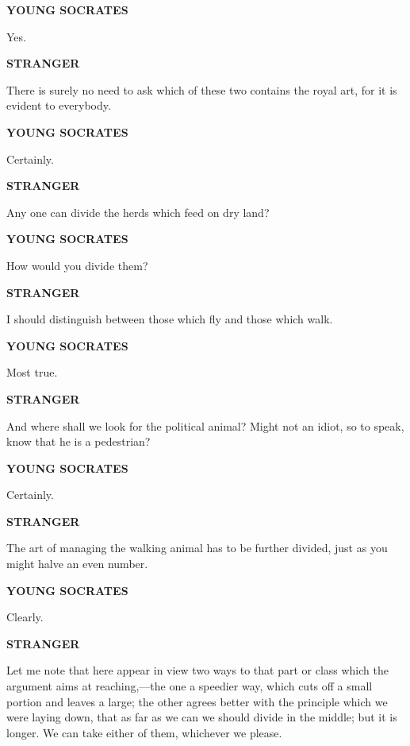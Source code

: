 \documentclass[11pt,letter]{article}
\begin{document}
\par \textbf{YOUNG SOCRATES}
\par   Yes.

\par \textbf{STRANGER}
\par   There is surely no need to ask which of these two contains the royal art, for it is evident to everybody.

\par \textbf{YOUNG SOCRATES}
\par   Certainly.

\par \textbf{STRANGER}
\par   Any one can divide the herds which feed on dry land?

\par \textbf{YOUNG SOCRATES}
\par   How would you divide them?

\par \textbf{STRANGER}
\par   I should distinguish between those which fly and those which walk.

\par \textbf{YOUNG SOCRATES}
\par   Most true.

\par \textbf{STRANGER}
\par   And where shall we look for the political animal? Might not an idiot, so to speak, know that he is a pedestrian?

\par \textbf{YOUNG SOCRATES}
\par   Certainly.

\par \textbf{STRANGER}
\par   The art of managing the walking animal has to be further divided, just as you might halve an even number.

\par \textbf{YOUNG SOCRATES}
\par   Clearly.

\par \textbf{STRANGER}
\par   Let me note that here appear in view two ways to that part or class which the argument aims at reaching,—the one a speedier way, which cuts off a small portion and leaves a large; the other agrees better with the principle which we were laying down, that as far as we can we should divide in the middle; but it is longer. We can take either of them, whichever we please.
\end{document}
